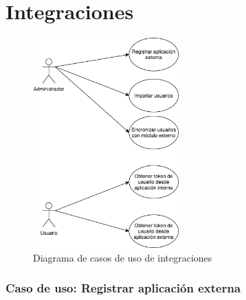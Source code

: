 \documentclass[12pt,a4paperpaper,]{report}
\begin{document}
\section{Integraciones}\label{integraciones}

\begin{figure}
\centering
\includegraphics[width=0.50000\textwidth]{source/figures/gestion-integraciones.png}
\caption{Diagrama de casos de uso de integraciones
\label{gestion_integraciones}}
\end{figure}

\subsubsection{Caso de uso: Registrar aplicación
externa}\label{caso-de-uso-registrar-aplicaciuxf3n-externa}
\end{document}
